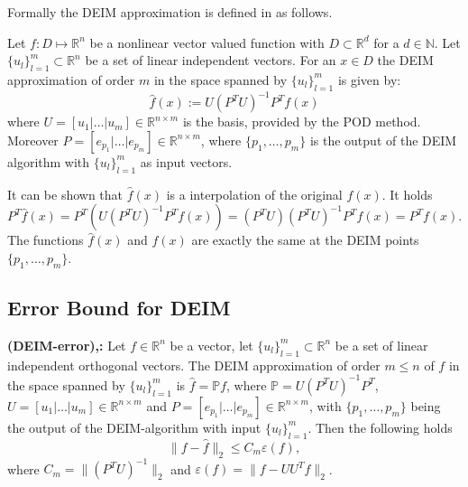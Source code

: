 Formally the DEIM approximation is defined in \cite{Chaturantabut2010Deim} as follows.
\begin{mydef}
 Let $f:D \longmapsto \mathbb{R}^n$ be a nonlinear vector valued function with $D \subset \mathbb{R}^d$ for a $d \in \mathbb{N}$.
 Let $\{u_l\}_{l=1}^m \subset \mathbb{R}^n$ be a set of linear independent vectors.
 For an $x \in D$ the DEIM approximation of order $m$ in the space spanned by $\{u_l\}_{l=1}^m$ is given by:
 \begin{equation}\label{deim_app}
  \hat{f}(x) := U(P^TU)^{-1}P^Tf(x)
 \end{equation}
 where $ U = [u_1 | \dots | u_m] \in \mathbb{R}^{n \times m}$ is the basis, provided by the POD method. Moreover $P = [e_{p_1} | \dots | e_{p_m}] \in \mathbb{R}^{n \times m}$,
 where $\{p_1,\dots,p_m\}$ is the output of the DEIM algorithm with $\{u_l\}_{l=1}^m$ as input vectors.
\end{mydef}
It can be shown that $\hat{f}(x)$ is a interpolation of the original $f(x)$. It holds
\begin{equation*}
 P^T\hat{f}(x)= P^T(U(P^TU)^{-1}P^Tf(x)) = (P^TU) (P^TU)^{-1}P^Tf(x)=P^Tf(x).
\end{equation*}
The functions $\hat{f}(x)$ and $f(x)$ are exactly the same at the DEIM points $\{p_1,\dots,p_m\}$.


\subsection{Error Bound for DEIM}
\begin{mytheo}\textbf{(DEIM-error),\cite{Chaturantabut2010Deim}:}
Let $f \in \mathbb{R}^n$ be a vector, let $\{u_l\}_{l=1}^m \subset \mathbb{R}^n$ be a set of linear 
independent orthogonal vectors.
The DEIM approximation of order $m \leq n$ of $f$ in the space spanned by $\{u_l\}_{l=1}^m$ is 
$\hat{f} = \mathbb{P}f$, where $\mathbb{P} = U(P^TU)^{-1}P^T$, $ U = [u_1 | \dots | u_m] \in \mathbb{R}^{n \times m}$ and $P = [e_{p_1} | \dots | e_{p_m}] \in \mathbb{R}^{n \times m}$,
 with $\{p_1,\dots,p_m\}$ being the output of the DEIM-algorithm with input $\{u_l\}_{l=1}^m$. Then the following holds
 \begin{equation}
  \parallel f-\hat{f} \parallel_2 \leq C_m \varepsilon(f),
 \end{equation}
where $C_m = \parallel (P^TU)^{-1}\parallel_2$ and $\varepsilon(f) = \parallel f - UU^Tf \parallel_2$. 
\end{mytheo}


